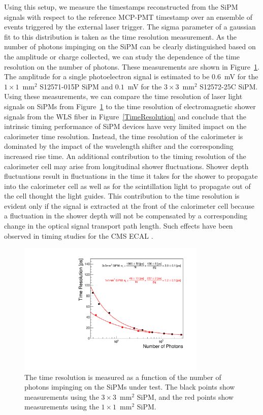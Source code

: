 Using this setup, we measure the timestamps reconstructed from the SiPM signals
with respect to the reference MCP-PMT timestamp over an ensemble of events
triggered by the external laser trigger. The sigma parameter of a gaussian fit
to this distribution is taken as the time resolution measurement.
As the number of photons impinging on the SiPM can be clearly distinguished 
based on the amplitude or charge collected, we can study the dependence of the 
time resolution on the number of photons. These measurements are shown in 
Figure~\ref{fig:TimeResolutionVsNPhotons}. The amplitude for a single
photoelectron signal is estimated to be $0.6$~mV for the $1\times1$~$\mathrm{mm}^{2}$ 
S12571-015P SiPM and $0.1$~mV for 
the $3\times 3$~$\mathrm{mm}^{2}$ S12572-25C SiPM. Using these 
measurements, we can compare the time resolution of laser light signals on
SiPMs from Figure~\ref{fig:TimeResolutionVsNPhotons} to the time resolution
of electromagnetic shower signals from the WLS fiber in Figure~\ref{TimeResolution}
and conclude that the intrinsic timing performance of SiPM devices 
have very limited impact on the calorimeter time resolution.
Instead, the time resolution of the calorimeter is dominated by the 
impact of the wavelength shifter and the corresponding increased rise time.
An additional contribution to the timing resolution of the calorimeter cell may
arise from longitudinal shower fluctuations. Shower depth fluctuations result in
fluctuations in the time it takes for the shower to propagate into the
calorimeter cell as well as for the scintillation light to propagate out of the
cell thought the light guides. This contribution to the time resolution
is evident only if the signal is extracted at the front of the calorimeter
cell because a fluctuation in the shower depth will not be 
compensated by a corresponding change in the optical signal 
transport path length. Such effects have been observed in
timing studies for the CMS ECAL \cite{ecaltimingconfnote}.

\begin{figure}[htbp] 
\centering
\includegraphics[width=0.8\textwidth]{figures/TimeResolutionVsNPhotons.pdf}
\caption{ The time resolution is measured as a function of the number of photons 
impinging on the SiPMs under test. The black points show measurements using the
$3\times3$~$\mathrm{mm}^{2}$ SiPM, and the red points show measurements
using the $1\times1$~$\mathrm{mm}^{2}$ SiPM. \label{fig:TimeResolutionVsNPhotons}
} 
\end{figure} 


